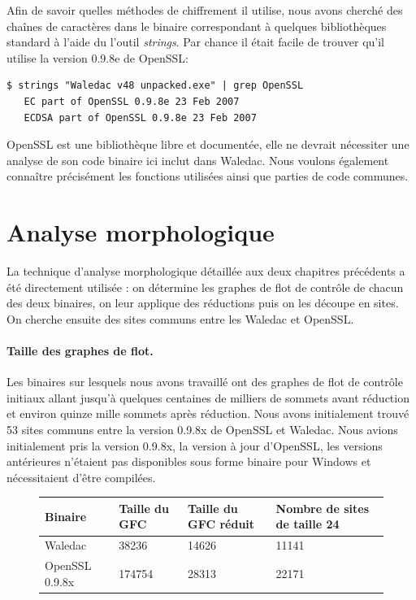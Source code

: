 Afin de savoir quelles méthodes de chiffrement il utilise, nous avons cherché des chaînes de caractères dans le binaire correspondant à quelques bibliothèques standard à l'aide du l'outil \emph{strings}.
Par chance il était facile de trouver qu'il utilise la version 0.9.8e de OpenSSL:
\begin{verbatim}
$ strings "Waledac v48 unpacked.exe" | grep OpenSSL
   EC part of OpenSSL 0.9.8e 23 Feb 2007
   ECDSA part of OpenSSL 0.9.8e 23 Feb 2007
\end{verbatim}

OpenSSL \cite{openssl} est une bibliothèque libre et documentée, elle ne devrait nécessiter une analyse de son code binaire ici inclut dans Waledac. Nous voulons également connaître précisément les fonctions utilisées ainsi que parties de code communes.

\section{Analyse morphologique}
La technique d'analyse morphologique détaillée aux deux chapitres précédents a été directement utilisée : on détermine les graphes de flot de contrôle de chacun des deux binaires, on leur applique des réductions puis on les découpe en sites.
On cherche ensuite des sites communs entre les Waledac et OpenSSL.

\paragraph{Taille des graphes de flot.}
Les binaires sur lesquels nous avons travaillé ont des graphes de flot de contrôle initiaux allant jusqu'à quelques centaines de milliers de sommets avant réduction et environ quinze mille sommets après réduction. Nous avons initialement trouvé 53 sites communs entre la version 0.9.8x de OpenSSL et Waledac.
Nous avions initialement pris la version 0.9.8x, la version à jour d'OpenSSL, les versions antérieures n'étaient pas disponibles sous forme binaire pour Windows et nécessitaient d'être compilées.

\begin{figure}[h]
\begin{tabular}{|l|l|l|l|}
\hline
 Binaire & Taille du GFC & Taille du GFC réduit & Nombre de sites de taille 24 	\\
\hline
 Waledac &  38236 & 14626 & 11141					  	\\
\hline
 OpenSSL 0.9.8x  & 174754 & 28313 & 22171				  	\\
\hline
\end{tabular}
\end{figure}

